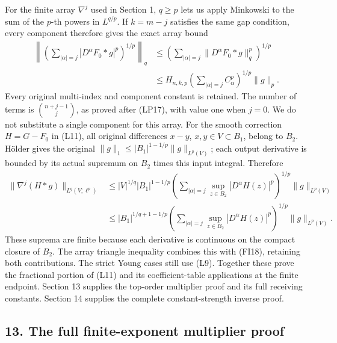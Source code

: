 \documentclass[
  11pt,
]{article}
\makeatletter
\let\ReaderOriginalAnchorStart\hyper@anchorstart
\let\ReaderOriginalAnchorEnd\hyper@anchorend
\let\ReaderPendingAliases\@empty
\def\ReaderArmAliases#1{\gdef\ReaderPendingAliases{#1}}
\def\hyper@anchorstart#1{\ReaderIfNativeAnchorTF{#1}{\ReaderPendingAliases\global\let\ReaderPendingAliases\@empty}{}\ReaderOriginalAnchorStart{#1}}
\makeatother
\begin{document}
For the finite array \(\nabla^j\) used in Section 1, \(q\geq p\) lets us
apply Minkowski to the sum of the \(p\)-th powers in \(L^{q/p}\). If
\(k=m-j\) satisfies the same gap condition, every component therefore
gives the exact array bound \[
 \begin{split}
 \left\|\left(\sum_{|\alpha|=j}
             |D^\alpha F_0*g|^p\right)^{1/p}\right\|_q
 &\leq\left(\sum_{|\alpha|=j}
                 \|D^\alpha F_0*g\|_q^p\right)^{1/p}\\
 &\leq H_{n,k,p}
         \left(\sum_{|\alpha|=j}C_\alpha^p\right)^{1/p}\|g\|_p .
 \end{split}                                                   \tag{FI18}
\] Every original multi-index and component constant is retained. The
number of terms is \(\binom{n+j-1}{j}\), as proved after (LP17), with
value one when \(j=0\). We do not substitute a single component for this
array. For the smooth correction \(H=G-F_0\) in (L11), all original
differences \(x-y\), \(x,y\in V\subset B_1\), belong to \(B_2\). Hölder
gives the original \(\|g\|_1\leq|B_1|^{1-1/p}\|g\|_{L^p(V)}\); each
output derivative is bounded by its actual supremum on \(B_2\) times
this input integral. Therefore \[
 \begin{split}
 \|\nabla^j(H*g)\|_{L^q(V;\ell^p)}
 &\leq |V|^{1/q}|B_1|^{1-1/p}
      \left(\sum_{|\alpha|=j}
          \sup_{z\in B_2}|D^\alpha H(z)|^p\right)^{1/p}
        \|g\|_{L^p(V)}\\
 &\leq |B_1|^{1/q+1-1/p}
      \left(\sum_{|\alpha|=j}
          \sup_{z\in B_2}|D^\alpha H(z)|^p\right)^{1/p}
        \|g\|_{L^p(V)} .
 \end{split}                                                   \tag{FI19}
\] These suprema are finite because each derivative is continuous on the
compact closure of \(B_2\). The array triangle inequality combines this
with (FI18), retaining both contributions. The strict Young cases still
use (L9). Together these prove the fractional portion of (L11) and its
coefficient-table applications at the finite endpoint. Section 13
supplies the top-order multiplier proof and its full receiving
constants. Section 14 supplies the complete constant-strength inverse
proof.

\ReaderArmAliases{\ReaderOriginalAnchorStart{the-full-finite-exponent-multiplier-proof}\ReaderOriginalAnchorEnd}
\subsection{13. The full finite-exponent multiplier
proof}\label{the-full-finite-exponent-multiplier-proof}
\end{document}
